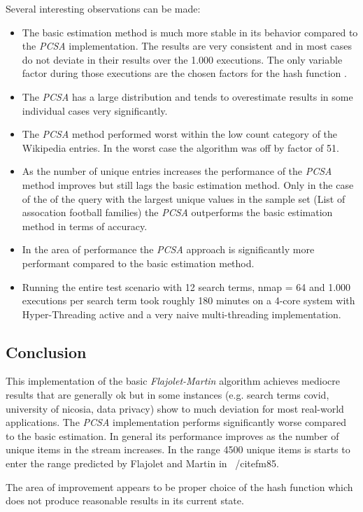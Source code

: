 \documentclass[11pt]{article}
\begin{document}
Several interesting observations can be made:
\begin{itemize}
\item The basic estimation method is much more stable in its behavior compared to the \emph{PCSA} implementation. The results are very consistent and in most cases do not deviate in their results over the 1.000 executions. The only variable factor during those executions are the chosen factors for the hash function .
\item The \emph{PCSA} has a large distribution and tends to overestimate results in some individual cases very significantly.
\item The \emph{PCSA} method performed worst within the low count category of the Wikipedia entries. In the worst case the algorithm was off by factor of 51.
\item As the number of unique entries increases the performance of the \emph{PCSA} method improves but still lags the basic estimation method. Only in the case of the of the query with the largest unique values in the sample set (List of assocation football families) the \emph{PCSA} outperforms the basic estimation method in terms of accuracy.
\item In the area of performance the \emph{PCSA} approach is significantly more performant compared to the basic estimation method.
\item Running the entire test scenario with 12 search terms, nmap = 64 and 1.000 executions per search term took roughly 180 minutes on a 4-core system with Hyper-Threading active and a very naive multi-threading implementation.
\end{itemize}

  
\subsection{Conclusion}
This implementation of the basic \emph{Flajolet-Martin} algorithm achieves mediocre results that are generally ok but in some instances (e.g. search terms covid, university of nicosia, data privacy) show to much deviation for most real-world applications. The \emph{PCSA} implementation performs significantly worse compared to the basic estimation. In general its performance improves as the number of unique items in the stream increases. In the range 4500 unique items is starts to enter the range predicted by Flajolet and Martin in ~/cite{fm85}.

The area of improvement appears to be proper choice of the hash function which does not produce reasonable results in its current state.
\end{document}
